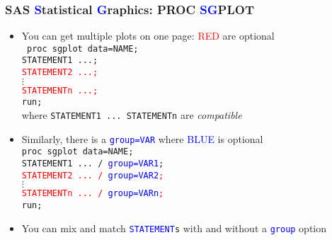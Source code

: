\documentclass[11pt,pdftex,dvipsnames,usenames,helvetica]{beamer}
\begin{document}
\begin{frame}[fragile]
\frametitle{SAS \textcolor{blue}{S}tatistical \textcolor{blue}{G}raphics:
PROC \textcolor{blue}{SG}PLOT }
\begin{itemize}
\item You can get multiple plots on one page:
\textcolor{red}{RED} are optional\\
{\tt %
proc sgplot data=NAME;\\
STATEMENT1 ...;\\
\textcolor{red}{STATEMENT2 ...;}\\
$\vdots$\\
\textcolor{red}{STATEMENTn ...;}\\
run;}\\
where {\tt STATEMENT1 ...\ STATEMENTn} are {\it compatible}
\item Similarly, there is a {\tt \textcolor{blue}{group=VAR}}
where \textcolor{blue}{BLUE} is optional\\
{\tt proc sgplot data=NAME;\\
STATEMENT1 ... / \textcolor{blue}{group=VAR1};\\
\textcolor{red}{STATEMENT2 ... / \textcolor{blue}{group=VAR2};}\\
$\vdots$\\
\textcolor{red}{STATEMENTn ... / \textcolor{blue}{group=VARn};}\\
run;}
\item You can mix and match {\tt \textcolor{blue}{STATEMENT}s}
with and without a {\tt \textcolor{blue}{group}} option
\end{itemize}
\end{frame}
\end{document}

